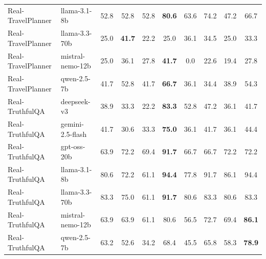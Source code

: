 \begin{tabular}{llcccccccc}
Real-TravelPlanner & llama-3.1-8b & 52.8 & 52.8 & 52.8 & \textbf{80.6} & 63.6 & 74.2 & 47.2 & 66.7 \\
Real-TravelPlanner & llama-3.3-70b & 25.0 & \textbf{41.7} & 22.2 & 25.0 & 36.1 & 34.5 & 25.0 & 33.3 \\
Real-TravelPlanner & mistral-nemo-12b & 25.0 & 36.1 & 27.8 & \textbf{41.7} & 0.0 & 22.6 & 19.4 & 27.8 \\
Real-TravelPlanner & qwen-2.5-7b & 41.7 & 52.8 & 41.7 & \textbf{66.7} & 36.1 & 34.4 & 38.9 & 54.3 \\
\midrule
Real-TruthfulQA & deepseek-v3 & 38.9 & 33.3 & 22.2 & \textbf{83.3} & 52.8 & 47.2 & 36.1 & 41.7 \\
Real-TruthfulQA & gemini-2.5-flash & 41.7 & 30.6 & 33.3 & \textbf{75.0} & 36.1 & 41.7 & 36.1 & 44.4 \\
Real-TruthfulQA & gpt-oss-20b & 63.9 & 72.2 & 69.4 & \textbf{91.7} & 66.7 & 66.7 & 72.2 & 72.2 \\
Real-TruthfulQA & llama-3.1-8b & 80.6 & 72.2 & 61.1 & \textbf{94.4} & 77.8 & 91.7 & 86.1 & 94.4 \\
Real-TruthfulQA & llama-3.3-70b & 83.3 & 75.0 & 61.1 & \textbf{91.7} & 80.6 & 83.3 & 80.6 & 83.3 \\
Real-TruthfulQA & mistral-nemo-12b & 63.9 & 63.9 & 61.1 & 80.6 & 56.5 & 72.7 & 69.4 & \textbf{86.1} \\
Real-TruthfulQA & qwen-2.5-7b & 63.2 & 52.6 & 34.2 & 68.4 & 45.5 & 65.8 & 58.3 & \textbf{78.9} \\
\bottomrule
\end{tabular}